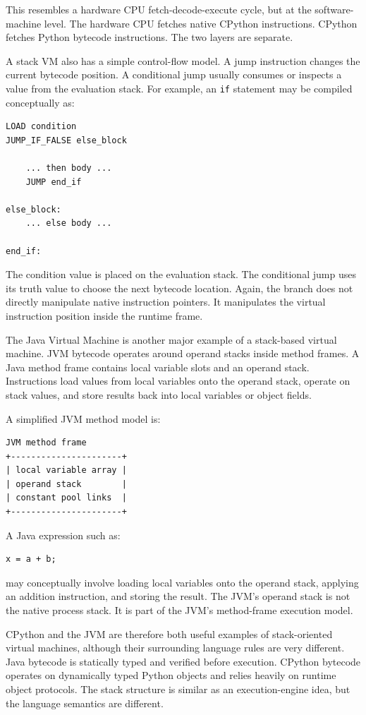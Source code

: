 \documentclass[a4paper,twoside]{report}
\begin{document}
This resembles a hardware CPU fetch-decode-execute cycle, but at the software-machine level. The hardware CPU fetches native CPython instructions. CPython fetches Python bytecode instructions. The two layers are separate.

A stack VM also has a simple control-flow model. A jump instruction changes the current bytecode position. A conditional jump usually consumes or inspects a value from the evaluation stack. For example, an \texttt{if} statement may be compiled conceptually as:

\begin{verbatim}
LOAD condition
JUMP_IF_FALSE else_block

    ... then body ...
    JUMP end_if

else_block:
    ... else body ...

end_if:
\end{verbatim}

The condition value is placed on the evaluation stack. The conditional jump uses its truth value to choose the next bytecode location. Again, the branch does not directly manipulate native instruction pointers. It manipulates the virtual instruction position inside the runtime frame.

The Java Virtual Machine is another major example of a stack-based virtual machine. JVM bytecode operates around operand stacks inside method frames. A Java method frame contains local variable slots and an operand stack. Instructions load values from local variables onto the operand stack, operate on stack values, and store results back into local variables or object fields.

A simplified JVM method model is:

\begin{verbatim}
JVM method frame
+----------------------+
| local variable array |
| operand stack        |
| constant pool links  |
+----------------------+
\end{verbatim}

A Java expression such as:

\begin{verbatim}
x = a + b;
\end{verbatim}

may conceptually involve loading local variables onto the operand stack, applying an addition instruction, and storing the result. The JVM's operand stack is not the native process stack. It is part of the JVM's method-frame execution model.

CPython and the JVM are therefore both useful examples of stack-oriented virtual machines, although their surrounding language rules are very different. Java bytecode is statically typed and verified before execution. CPython bytecode operates on dynamically typed Python objects and relies heavily on runtime object protocols. The stack structure is similar as an execution-engine idea, but the language semantics are different.
\end{document}
